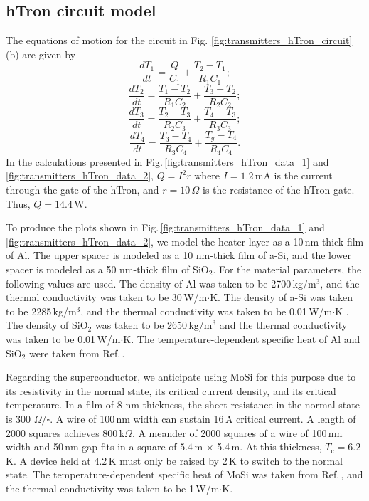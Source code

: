 \documentclass[aip,amsmath,amssymb,reprint,nofootinbib]{revtex4-1}
\begin{document}
\subsection{hTron circuit model}
The equations of motion for the circuit in Fig. \ref{fig:transmitters_hTron_circuit}(b) are given by
\begin{equation}
\label{eq:hTron_eq01}
\frac{dT_1}{dt} = \frac{Q}{C_1} + \frac{T_2-T_1}{R_1C_1};
\end{equation}
\begin{equation}
\label{eq:hTron_eq02}
\frac{dT_2}{dt} = \frac{T_1-T_2}{R_1C_2} + \frac{T_3-T_2}{R_2C_2};
\end{equation}
\begin{equation}
\label{eq:hTron_eq03}
\frac{dT_3}{dt} = \frac{T_2-T_3}{R_2C_3} + \frac{T_4-T_3}{R_3C_3};
\end{equation}
\begin{equation}
\label{eq:hTron_eq04}
\frac{dT_4}{dt} = \frac{T_3-T_4}{R_3C_4} + \frac{T_g-T_4}{R_4C_4}.
\end{equation}
In the calculations presented in Fig.\,\ref{fig:transmitters_hTron_data_1} and \ref{fig:transmitters_hTron_data_2}, $Q = I^2r$ where $I = 1.2$\,mA is the current through the gate of the hTron, and $r = 10$\,$\Omega$ is the resistance of the hTron gate. Thus, $Q = 14.4$\,\textmu W.

To produce the plots shown in Fig.\,\ref{fig:transmitters_hTron_data_1} and \ref{fig:transmitters_hTron_data_2}, we model the heater layer as a 10\,nm-thick film of Al. The upper spacer is modeled as a 10 nm-thick film of a-Si, and the lower spacer is modeled as a 50 nm-thick film of SiO$_2$. For the material parameters, the following values are used. The density of Al was taken to be 2700\,kg/m$^3$, and the thermal conductivity was taken to be 30\,W/m$\cdot$K. The density of a-Si was taken to be 2285\,kg/m$^3$, and the thermal conductivity was taken to be 0.01\,W/m$\cdot$K \cite{zipi2006}. The density of SiO$_2$ was taken to be 2650\,kg/m$^3$ and the thermal conductivity was taken to be 0.01\,W/m$\cdot$K. The temperature-dependent specific heat of Al and SiO$_2$ were taken from Ref.\,. 

Regarding the superconductor, we anticipate using MoSi for this purpose due to its resistivity in the normal state, its critical current density, and its critical temperature. In a film of 8 nm thickness, the sheet resistance in the normal state is 300 $\Omega/\square$. A wire of 100\,nm width can sustain 16\,\textmu A critical current. A length of 2000 squares achieves 800\,k$\Omega$. A meander of 2000 squares of a wire of 100\,nm width and 50\,nm gap fits in a square of $5.4$\,\textmu m $\times$ 5.4\,\textmu m. At this thickness, $T_{\mathrm{c}} = 6.2$\,K. A device held at 4.2\,K must only be raised by 2\,K to switch to the normal state. The temperature-dependent specific heat of MoSi was taken from Ref.\,, and the thermal conductivity was taken to be 1\,W/m$\cdot$K.
\end{document}

